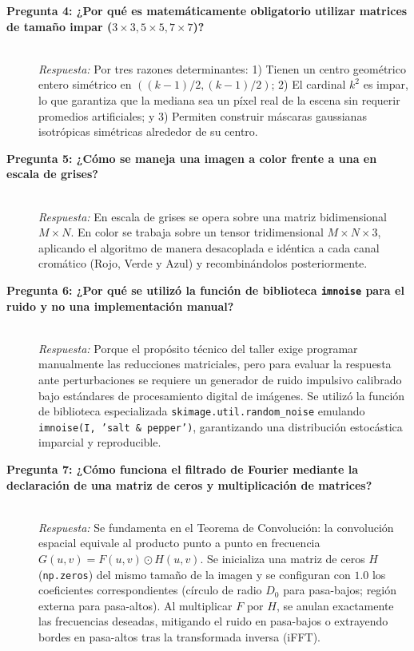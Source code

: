 \documentclass{article}
\begin{document}
\begin{description}
    \item[\textbf{Pregunta 4: ¿Por qué es matemáticamente obligatorio utilizar matrices de tamaño impar ($3\times3, 5\times5, 7\times7$)?}]~\\
    \textit{Respuesta:} Por tres razones determinantes: 1) Tienen un centro geométrico entero simétrico en $((k-1)/2, (k-1)/2)$; 2) El cardinal $k^2$ es impar, lo que garantiza que la mediana sea un píxel real de la escena sin requerir promedios artificiales; y 3) Permiten construir máscaras gaussianas isotrópicas simétricas alrededor de su centro.

    \item[\textbf{Pregunta 5: ¿Cómo se maneja una imagen a color frente a una en escala de grises?}]~\\
    \textit{Respuesta:} En escala de grises se opera sobre una matriz bidimensional $M \times N$. En color se trabaja sobre un tensor tridimensional $M \times N \times 3$, aplicando el algoritmo de manera desacoplada e idéntica a cada canal cromático (Rojo, Verde y Azul) y recombinándolos posteriormente.

    \item[\textbf{Pregunta 6: ¿Por qué se utilizó la función de biblioteca \texttt{imnoise} para el ruido y no una implementación manual?}]~\\
    \textit{Respuesta:} Porque el propósito técnico del taller exige programar manualmente las reducciones matriciales, pero para evaluar la respuesta ante perturbaciones se requiere un generador de ruido impulsivo calibrado bajo estándares de procesamiento digital de imágenes. Se utilizó la función de biblioteca especializada \texttt{skimage.util.random\_noise} emulando \texttt{imnoise(I, 'salt \& pepper')}, garantizando una distribución estocástica imparcial y reproducible.

    \item[\textbf{Pregunta 7: ¿Cómo funciona el filtrado de Fourier mediante la declaración de una matriz de ceros y multiplicación de matrices?}]~\\
    \textit{Respuesta:} Se fundamenta en el Teorema de Convolución: la convolución espacial equivale al producto punto a punto en frecuencia $G(u, v) = F(u, v) \odot H(u, v)$. Se inicializa una matriz de ceros $H$ (\texttt{np.zeros}) del mismo tamaño de la imagen y se configuran con $1.0$ los coeficientes correspondientes (círculo de radio $D_0$ para pasa-bajos; región externa para pasa-altos). Al multiplicar $F$ por $H$, se anulan exactamente las frecuencias deseadas, mitigando el ruido en pasa-bajos o extrayendo bordes en pasa-altos tras la transformada inversa (iFFT).


\end{description}
\end{document}
